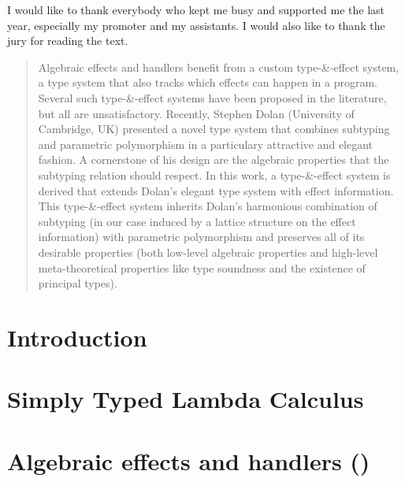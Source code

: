 \documentclass[master=ecws, masteroption=ai]{kulemt} %
\let\section\chapter
\begin{document}
\begin{preface}
  I would like to thank everybody who kept me busy and supported me the last year,
  especially my promoter and my assistants. I would also like to thank the
  jury for reading the text.
\end{preface}

\tableofcontents*

\begin{abstract}
  Algebraic effects and handlers benefit from a custom type-\&-effect system, a type system that also tracks which effects can happen in a program. Several such type-\&-effect systems have been proposed in the literature, but all are unsatisfactory. Recently, Stephen Dolan (University of Cambridge, UK) presented a novel type system that combines subtyping and parametric polymorphism in a particulary attractive and elegant fashion. A cornerstone of his design are the algebraic properties that the subtyping relation should respect. In this work, a type-\&-effect system is derived that extends Dolan's elegant type system with effect information. This type-\&-effect system inherits Dolan's harmonious combination of subtyping (in our case induced by a lattice structure on the effect information) with parametric polymorphism and preserves all of its desirable properties (both low-level algebraic properties and high-level meta-theoretical properties like type soundness and the existence of principal types).
\end{abstract}

\listoffigures
\listoftables

\mainmatter

\section{Introduction}


\section{Simply Typed Lambda Calculus}


\section{Algebraic effects and handlers (\eff)}



\end{document}
